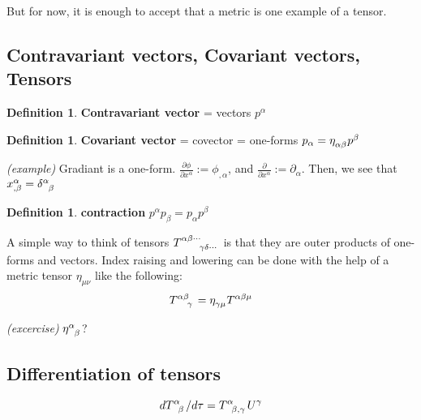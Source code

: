 \documentclass{article}
\theoremstyle{plain}
\theoremstyle{definition}
\newtheorem{defn}[thm]{Definition} %
\begin{document}
But for now, it is enough to accept that a metric is one example of a tensor.

\subsection{Contravariant vectors, Covariant vectors, Tensors}

\begin{defn} \textbf{Contravariant vector} = vectors $p^\alpha$ \end{defn}

\begin{defn} \textbf{Covariant vector} = covector = one-forms $p_\alpha = \eta\indices{_\alpha_\beta} p^\beta$ \end{defn}
\noindent \textit{(example)} Gradiant is a one-form. $\frac{\partial \phi}{\partial x^\alpha} := \phi_{, \alpha}$, and $\frac{\partial}{\partial x^\alpha} := \partial_{\alpha}$. Then, we see that $x^\alpha_{,\beta} = \delta\indices{^\alpha_\beta}$

\begin{defn} \textbf{contraction} $p^\alpha p_\beta = p_\alpha p^\beta$ \end{defn}

A simple way to think of tensors $T\indices{^{\alpha\beta\cdots}_{\gamma\delta\cdots}}$ is that they are outer products of one-forms and vectors. Index raising and lowering can be done with the help of a metric tensor $\eta_{\mu\nu}$ like the following:
\begin{equation}
    T\indices{^{\alpha\beta}_\gamma} = \eta\indices{_{\gamma\mu}} T\indices{^{\alpha\beta\mu}}
\end{equation}

\noindent \textit{(excercise)} $\eta\indices{^\alpha_\beta}$?

\subsection{Differentiation of tensors}
\begin{equation}
    d T\indices{^\alpha_\beta}/ d\tau = T\indices{^\alpha_{\beta,\gamma}} U^\gamma
\end{equation}



\end{document}
